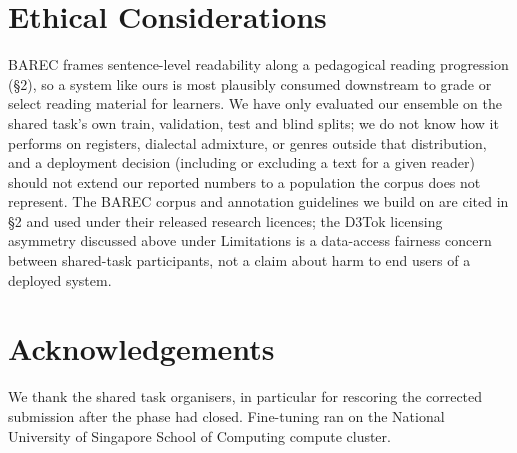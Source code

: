 \documentclass[11pt]{article}
\begin{document}
\section*{Ethical Considerations}

BAREC frames sentence-level readability along a pedagogical reading progression (\S2), so a
system like ours is most plausibly consumed downstream to grade or select reading material
for learners. We have only evaluated our ensemble on the shared task's own train, validation,
test and blind splits; we do not know how it performs on registers, dialectal admixture, or
genres outside that distribution, and a deployment decision (including or excluding a text
for a given reader) should not extend our reported numbers to a population the corpus does
not represent. The BAREC corpus and annotation guidelines we build on are cited in \S2 and
used under their released research licences; the D3Tok licensing asymmetry discussed above under Limitations is a
data-access fairness concern between shared-task participants, not a claim about harm to end
users of a deployed system.

\section*{Acknowledgements}

We thank the shared task organisers, in particular for rescoring the corrected submission
after the phase had closed. Fine-tuning ran on the National University of Singapore
School of Computing compute cluster.



\appendix

\end{document}

